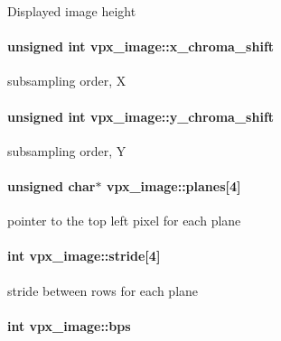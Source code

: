 \label{structvpx__image_a31bc5f045d4f3c2b6bb0f57bb53078e7}
\-Displayed image height \hypertarget{structvpx__image_affaf210489dcefebd90b87fd5f12dc0b}{
\paragraph[{x\-\_\-chroma\-\_\-shift}]{\setlength{\rightskip}{0pt plus 5cm}unsigned int {\bf vpx\-\_\-image\-::x\-\_\-chroma\-\_\-shift}}}
\label{structvpx__image_affaf210489dcefebd90b87fd5f12dc0b}
subsampling order, \-X \hypertarget{structvpx__image_a1e3d9b699d46ca32e3916d1ac635a4a2}{
\paragraph[{y\-\_\-chroma\-\_\-shift}]{\setlength{\rightskip}{0pt plus 5cm}unsigned int {\bf vpx\-\_\-image\-::y\-\_\-chroma\-\_\-shift}}}
\label{structvpx__image_a1e3d9b699d46ca32e3916d1ac635a4a2}
subsampling order, \-Y \hypertarget{structvpx__image_ab6258308ba7a5f4a113348120e20e2ce}{
\paragraph[{planes}]{\setlength{\rightskip}{0pt plus 5cm}unsigned char$\ast$ {\bf vpx\-\_\-image\-::planes}\mbox{[}4\mbox{]}}}
\label{structvpx__image_ab6258308ba7a5f4a113348120e20e2ce}
pointer to the top left pixel for each plane \hypertarget{structvpx__image_ac9c7b83e3eea44cb680956f90dc789cf}{
\paragraph[{stride}]{\setlength{\rightskip}{0pt plus 5cm}int {\bf vpx\-\_\-image\-::stride}\mbox{[}4\mbox{]}}}
\label{structvpx__image_ac9c7b83e3eea44cb680956f90dc789cf}
stride between rows for each plane \hypertarget{structvpx__image_a53a02fad822151eb8eeb2f64f195e1f6}{
\paragraph[{bps}]{\setlength{\rightskip}{0pt plus 5cm}int {\bf vpx\-\_\-image\-::bps}}}

